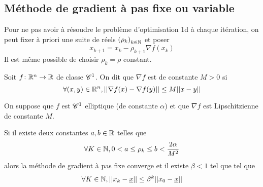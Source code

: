 \documentclass[french,a4paper,10pt]{article}
\begin{document}
	\subsection{Méthode de gradient à pas fixe ou variable}

	Pour ne pas avoir à résoudre le problème d'optimisation 1d à chaque itération,
	on peut fixer à priori une suite de réels ${(\rho_k)}_{k\in\mathbb{N}}$ et poser
	\[
		x_{k+1}=x_k-\rho_{k+1}\nabla f(x_k)
	\]
	Il est même possible de choisir $\rho_k=\rho$ constant.

	\begin{oc-definition}
		Soit $f\colon \mathbb{R}^n\to\mathbb{R}$ de classe $\mathscr{C}^1$. On dit que
		$\nabla f$ est  de constante $M>0$ si
		\[
			\forall (x,y)\in\mathbb{R}^n, ||\nabla f(x)-\nabla f(y)||\leq M||x-y||
		\]
	\end{oc-definition}

	\begin{oc-theorem}
		On suppose que $f$ est $\mathscr{C}^1$ elliptique (de constante $\alpha$) et que
		$\nabla f$ est Lipschitzienne de constante $M$.

		Si il existe deux constantes $a,b\in \mathbb{R}$ telles que
		\[
			\forall K\in\mathbb{N},0<a\leq \rho_k\leq b<\frac{2\alpha}{M^2}
		\]
		alors la méthode de gradient à pas fixe converge et il existe $\beta<1$ tel que
		tel que
		\[
			\forall K\in\mathbb{N},||x_k-\underline{x}||\leq \beta^k||x_0-\underline{x}||
		\]
	\end{oc-theorem}
\end{document}
